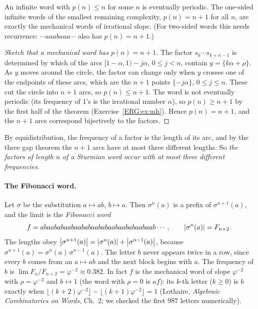 \begin{theorem}\label{ERG:thm:morsehedlund}
An infinite word with $p(n)\le n$ for some $n$ is eventually periodic. The one-sided infinite words of
the smallest remaining complexity, $p(n)=n+1$ for all $n$, are exactly the mechanical words of
irrational slope. (For two-sided words this needs recurrence: $\cdots aaabaaa\cdots$ also has
$p(n)=n+1$.)
\end{theorem}

\begin{proof}[Sketch that a mechanical word has $p(n)=n+1$]
The factor $s_k\cdots s_{k+n-1}$ is determined by which of the arcs $[1-\alpha,1)-j\alpha$,
$0\le j<n$, contain $y=\{k\alpha+\rho\}$. As $y$ moves around the circle, the factor can change only when
$y$ crosses one of the endpoints of these arcs, which are the $n+1$ points $\{-j\alpha\}$, $0\le j\le n$.
These cut the circle into $n+1$ arcs, so $p(n)\le n+1$. The word is not eventually periodic (its frequency
of $1$'s is the irrational number $\alpha$), so $p(n)\ge n+1$ by the first half of the theorem
(Exercise~\ref{ERG:ex:mh}). Hence $p(n)=n+1$, and the $n+1$ arcs correspond bijectively to the factors.
\end{proof}

By equidistribution, the frequency of a factor is the length of its arc, and by the three gap theorem
the $n+1$ arcs have at most three different lengths. So \emph{the factors of length $n$ of a Sturmian
word occur with at most three different frequencies}.

\paragraph{The Fibonacci word.} Let $\sigma$ be the substitution $a\mapsto ab$, $b\mapsto a$. Then
$\sigma^n(a)$ is a prefix of $\sigma^{n+1}(a)$, and the limit is the \emph{Fibonacci word}
\[
  f=abaababaabaababaababaabaababaabaab\cdots,\qquad \left\lvert \sigma^n(a) \right\rvert=F_{n+2}.
\]
The lengths obey $\left\lvert \sigma^{n+1}(a) \right\rvert=\left\lvert \sigma^n(a) \right\rvert+\left\lvert \sigma^{n-1}(a) \right\rvert$, because
$\sigma^{n+1}(a)=\sigma^n(a)\,\sigma^{n-1}(a)$. The letter $b$ never appears twice in a row, since
every $b$ comes from an $a\mapsto ab$ and the next block begins with $a$. The frequency of $b$ is
$\lim F_n/F_{n+2}=\varphi^{-2}\approx0.382$. In fact $f$ is the mechanical word of slope
$\varphi^{-2}$ with $\rho=\varphi^{-2}$ and $b\leftrightarrow1$ (the word with $\rho=0$ is $af$): its $k$-th letter ($k\ge0$) is $b$ exactly when
$\lfloor(k+2)\varphi^{-2}\rfloor-\lfloor(k+1)\varphi^{-2}\rfloor=1$ (Lothaire,
\emph{Algebraic Combinatorics on Words}, Ch.~2; we checked the first $987$ letters numerically).


